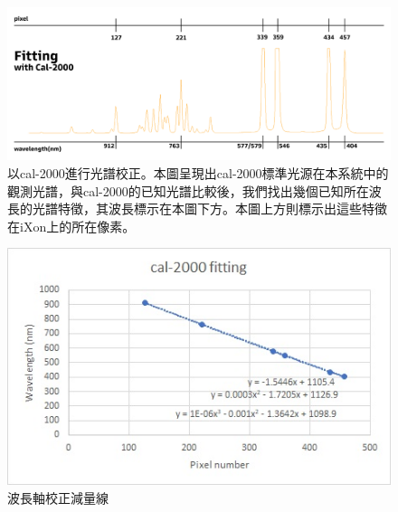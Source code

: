 \documentclass[12pt]{article}
\begin{document}
\begin{figure}[h]
    \centering
    \includegraphics[width=\linewidth]{fitting.jpg}
    \caption[以cal-2000進行光譜校正]{以cal-2000進行光譜校正。本圖呈現出cal-2000標準光源在本系統中的觀測光譜，與cal-2000的已知光譜比較後，我們找出幾個已知所在波長的光譜特徵，其波長標示在本圖下方。本圖上方則標示出這些特徵在iXon上的所在像素。}
    \label{figure: fitting}
\end{figure}
\begin{figure}[h]
    \centering
    \includegraphics[width=\linewidth]{cal-2000fitting.jpg}
    \caption{波長軸校正減量線}
    \label{figure: fit curve}
\end{figure}
\end{document}
